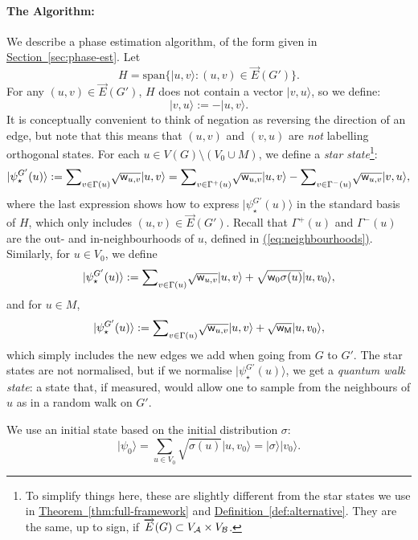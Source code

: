 \documentclass{theoretics}
\newcommand{\eq}[1]{\hyperref[eq:#1]{(\ref*{eq:#1})}}
\renewcommand{\sec}[1]{\hyperref[sec:#1]{Section~\ref*{sec:#1}}}
\newcommand{\thm}[1]{\hyperref[thm:#1]{Theorem~\ref*{thm:#1}}}
\newcommand{\defin}[1]{\hyperref[def:#1]{Definition~\ref*{def:#1}}}
\def\ket#1{{\lvert}#1\rangle}
\renewcommand{\>}{\rangle}
\newcommand{\<}{\langle}
\renewcommand{\(}{\left(}
\renewcommand{\)}{\right)}
\def\w{{\sf w}}
\begin{document}
\paragraph{The Algorithm:} We describe a phase estimation algorithm, of the form given in \sec{phase-est}. Let 
$$H=\mathrm{span}\{\ket{u,v}:(u,v)\in\overrightarrow{E}(G')\}.$$
For any $(u,v)\in \overrightarrow{E}(G')$, $H$ does not contain a vector $\ket{v,u}$, so we define:
$$\ket{v,u} := -\ket{u,v}.$$
It is conceptually convenient to think of negation as reversing the direction of an edge, but note that this means that $(u,v)$ and $(v,u)$ are \emph{not} labelling orthogonal states. 
For each $u\in V(G)\setminus (V_0\cup M)$, we define a \emph{star state}\footnote{To simplify things here, these are slightly different from the star states we use in \thm{full-framework} and \defin{alternative}. They are the same, up to sign, if $\overrightarrow{E}(G)\subset V_{\cal A}\times V_{\cal B}$.}:
\begin{equation*}
\ket{\psi_\star^{G'}(u)}:=\textstyle{\displaystyle\sum}_{v\in\Gamma(u)}\sqrt{\w_{u,v}}\ket{u,v}=\textstyle{\displaystyle\sum}_{v\in\Gamma^+(u)}\sqrt{\w_{u,v}}\ket{u,v} - \textstyle{\displaystyle\sum}_{v\in\Gamma^-(u)}\sqrt{\w_{u,v}}\ket{v,u},
\end{equation*}
where the last expression shows how to express $\ket{\psi_\star^{G'}(u)}$ in the standard basis of $H$, which only includes $(u,v)\in\overrightarrow{E}(G')$. Recall that $\Gamma^+(u)$ and $\Gamma^-(u)$ are the out- and in-neighbourhoods of $u$, defined in \eq{neighbourhoods}.
Similarly, for $u\in V_0$, we define
\begin{equation*}
\ket{\psi_\star^{G'}(u)}:=\textstyle{\displaystyle\sum}_{v\in\Gamma(u)}\sqrt{\w_{u,v}}\ket{u,v}+\sqrt{\w_0\sigma(u)}\ket{u,v_0},
\end{equation*}
and for $u\in M$,
\begin{equation*}
\ket{\psi_\star^{G'}(u)}:=\textstyle{\displaystyle\sum}_{v\in\Gamma(u)}\sqrt{\w_{u,v}}\ket{u,v}+\sqrt{\w_{\sf M}}\ket{u,v_0},
\end{equation*}
which simply includes the new edges we add when going from $G$ to $G'$. The star states are not normalised, but if we normalise $\ket{\psi_\star^{G'}(u)}$, we get a \emph{quantum walk state}: a state that, if measured, would allow one to sample from the neighbours of $u$ as in a random walk on $G'$. 

We use an initial state based on the initial distribution $\sigma$:
$$\ket{\psi_0}=\textstyle{\displaystyle\sum}_{u\in V_0}\sqrt{\sigma(u)}\ket{u,v_0}=\ket{\sigma}\ket{v_0}.$$
\end{document}
